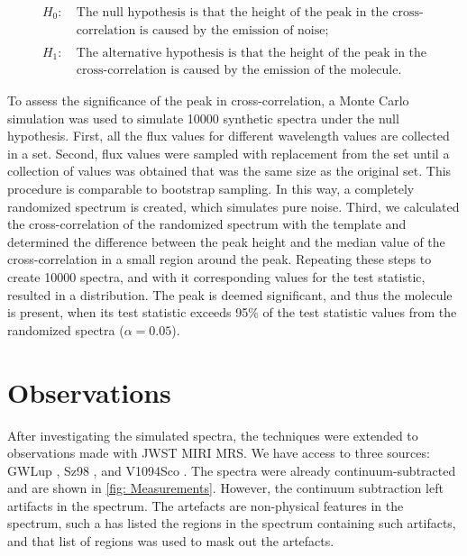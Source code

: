 \documentclass[oneside, single, authoryear, semicolon, 12pt]{lion-msc}
\newcommand{\4}{$_4$}
\newcommand{\3}{$_3$}
\newcommand{\2}{$_2$}
\begin{document}
\[
\begin{aligned}
H_0: &\ \text{The null hypothesis is that the height of the peak in the cross-} \\
     &\ \text{correlation is caused by the emission of noise;}\\
     \\
H_1: &\ \text{The alternative hypothesis is that the height of the peak in the} \\
     &\ \text{cross-correlation is caused by the emission of the molecule.}
\end{aligned}
\]

To assess the significance of the peak in cross-correlation, a Monte Carlo simulation was used to simulate 10000 synthetic spectra under the null hypothesis. First, all the flux values for different wavelength values are collected in a set. Second, flux values were sampled with replacement from the set until a collection of values was obtained that was the same size as the original set. This procedure is comparable to bootstrap sampling. In this way, a completely randomized spectrum is created, which simulates pure noise. Third, we calculated the cross-correlation of the randomized spectrum with the template and determined the difference between the peak height and the median value of the cross-correlation in a small region around the peak. Repeating these steps to create 10000 spectra, and with it corresponding values for the test statistic, resulted in a distribution. The peak is deemed significant, and thus the molecule is present, when its test statistic exceeds 95\% of the test statistic values from the randomized spectra ($\alpha=0.05$).


\section{Observations}
After investigating the simulated spectra, the techniques were extended to observations made with JWST MIRI MRS. We have access to three sources: GWLup \citep{Gasman_2023}, Sz98 \citep{Grant_2023}, and V1094Sco \citep{taboneinprepp}. The spectra were already continuum-subtracted and are shown in \autoref{fig: Measurements}. However, the continuum subtraction left artifacts in the spectrum. The artefacts are non-physical features in the spectrum, such a \cite{Grant_2023} has listed the regions in the spectrum containing such artifacts, and that list of regions was used to mask out the artefacts. 
\end{document}
